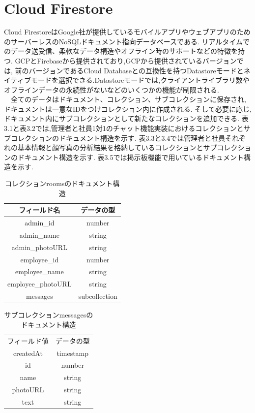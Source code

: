 \section{Cloud Firestore}
\label{sec:reference_cloud}
Cloud FirestoreはGoogle社が提供しているモバイルアプリやウェブアプリのためのサーバーレスのNoSQLドキュメント指向データベースである.
リアルタイムでのデータ送受信、柔軟なデータ構造やオフライン時のサポートなどの特徴を持つ.
GCPとFirebaseから提供されており,GCPから提供されているバージョンでは,
前のバージョンであるCloud Databaseとの互換性を持つDatastoreモードとネイティブモードを選択できる.Datastoreモードでは,クライアントライブラリ数やオフラインデータの永続性がないなどのいくつかの機能が制限される. \\
　全てのデータはドキュメント、コレクション、サブコレクションに保存され,
ドキュメントは一意なIDをつけコレクション内に作成される.
そして必要に応じ,ドキュメント内にサブコレクションとして新たなコレクションを追加できる.
表3.1と表3.2では,管理者と社員1対1のチャット機能実装におけるコレクションとサブコレクションのドキュメント構造を示す.
表3.3と3.4では管理者と社員それぞれの基本情報と顔写真の分析結果を格納しているコレクションとサブコレクションのドキュメント構造を示す.
表3.5では掲示板機能で用いているドキュメント構造を示す.

\begin{table}[hbtp]
  \caption{コレクションroomsのドキュメント構造}
  \label{table:data_type}
  \centering
  \begin{tabular}{c|c} \hline
    フィールド名  & データの型   \\ \hline
    admin\_id  & number  \\ 
    admin\_name  & string   \\
    admin\_photoURL  &  string \\
    employee\_id  & number  \\ 
    employee\_name  & string   \\
    employee\_photoURL  &  string \\
    messages  &  subcollection \\ \hline
  \end{tabular}
\end{table}

\begin{table}[hbtp]
  \caption{サブコレクションmessagesのドキュメント構造}
  \label{table:data_type}
  \centering
  \begin{tabular}{c|c} \hline
    フィールド値  & データの型  \\
    createdAt  & timestamp \\
    id  & number  \\
    name  & string  \\
    photoURL  &  string \\
    text  &  string \\ \hline
  \end{tabular}
\end{table}


